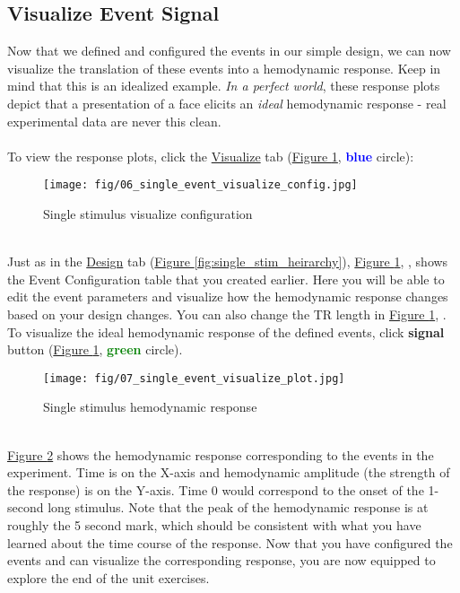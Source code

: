 \documentclass[10pt]{article}
\newcommand*\circled[1]{\tikz[baseline=(char.base)]{
            \node[shape=circle,draw,inner sep=.5pt] (char) {#1};}}
\begin{document}
	\subsection{Visualize Event Signal}
	\label{subsec:u1viz}
		Now that we defined and configured the events in our simple design, we can now visualize the translation of these events into a hemodynamic response.
		Keep in mind that this is an idealized example.
		\textit{In a perfect world}, these response plots depict that a presentation of a face elicits an \textit{ideal} hemodynamic response - real experimental data are never this clean. \\ \\
		To view the response plots, click the \hyperref[subsubsec:visualize]{Visualize} tab (\hyperref[fig:single_stim_viz_config]{Figure \ref{fig:single_stim_viz_config}}, \textcolor{blue}{\textbf{blue}} circle):
		\begin{figure}[ht]
			\centering
			\texttt{[image: fig/06\_single\_event\_visualize\_config.jpg]}
			\caption{Single stimulus visualize configuration}
			\label{fig:single_stim_viz_config}
		\end{figure} \\
		Just as in the \hyperref[subsubsec:design]{Design} tab (\hyperref[fig:single_stim_heirarchy]{Figure \ref{fig:single_stim_heirarchy}}), \hyperref[fig:single_stim_viz_config]{Figure \ref{fig:single_stim_viz_config}}, \circled{1}, shows the Event Configuration table that you created earlier.
		Here you will be able to edit the event parameters and visualize how the hemodynamic response changes based on your design changes.
		You can also change the TR length in \hyperref[fig:single_stim_viz_config]{Figure \ref{fig:single_stim_viz_config}}, \circled{2}.
		To visualize the ideal hemodynamic response of the defined events, click \textbf{signal} button (\hyperref[fig:single_stim_viz_config]{Figure \ref{fig:single_stim_viz_config}}, \textcolor{green}{\textbf{green}} circle).
		\begin{figure}[ht]
			\centering
			\texttt{[image: fig/07\_single\_event\_visualize\_plot.jpg]}
			\caption{Single stimulus hemodynamic response}
			\label{fig:single_stim_HRF}
		\end{figure} \\
		\hyperref[fig:single_stim_HRF]{Figure \ref{fig:single_stim_HRF}} shows the hemodynamic response corresponding to the events in the experiment.
		Time is on the X-axis and hemodynamic amplitude (the strength of the response) is on the Y-axis.
		Time 0 would correspond to the onset of the 1-second long stimulus. 
		Note that the peak of the hemodynamic response is at roughly the 5 second mark, which should be consistent with what you have learned about the time course of the response.
		Now that you have configured the events and can visualize the corresponding response, you are now equipped to explore the end of the unit exercises.
		\newpage
\end{document}
